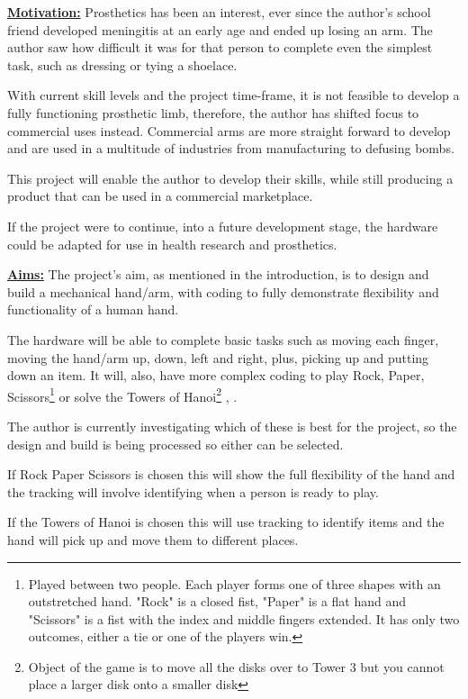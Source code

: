 \documentclass[progress]{cmpreport}
\begin{document}
\textbf{\underline{Motivation:}} Prosthetics has been an interest, ever since the author's school friend developed meningitis at an early age and ended up losing an arm. The author saw how difficult it was for that person to complete even the simplest task, such as dressing or tying a shoelace. 

With current skill levels and the project time-frame, it is not feasible to develop a fully functioning prosthetic limb, therefore, the author has shifted focus to commercial uses instead. Commercial arms are more straight forward to develop and are used in a multitude of industries from manufacturing to defusing bombs. 

This project will enable the author to develop their skills, while still producing a product that can be used in a commercial marketplace. 

If the project were to continue, into a future development stage, the hardware could be adapted for use in health research and prosthetics. \newline

\noindent\textbf{\underline{Aims:}} The project's aim, as mentioned in the introduction, is to design and build a mechanical hand/arm, with coding to fully demonstrate flexibility and functionality of a human hand. 

The hardware will be able to complete basic tasks such as moving each finger, moving the hand/arm up, down, left and right, plus, picking up and putting down an item. It will, also, have more complex coding to play Rock, Paper, Scissors\footnote{Played between two people. Each player forms one of three shapes with an outstretched hand. "Rock" is a closed fist, "Paper" is a flat hand and "Scissors" is a fist with the index and middle fingers extended. It has only two outcomes, either a tie or one of the players win.} or solve the Towers of Hanoi\footnote{Object of the game is to move all the disks over to Tower 3 but you cannot place a larger disk onto a smaller disk} \citep{DBLP:conf/case/ItoSYI16}, \citep{DBLP:journals/corr/abs-cs-0612070}.  

The author is currently investigating which of these is best for the project, so the design and build is being processed so either can be selected.

If Rock Paper Scissors is chosen this will show the full flexibility of the hand and the tracking will involve identifying when a person is ready to play.

If the Towers of Hanoi is chosen this will use tracking to identify items and the hand will pick up and move them to different places.
\end{document}
